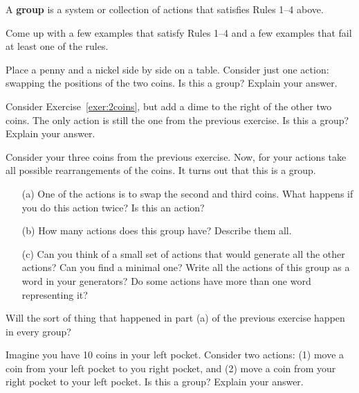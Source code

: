 \begin{intuitivedef}\label{def:informal_group}
A \textbf{group} is a system or collection of actions that satisfies Rules 1--4 above.
\end{intuitivedef}

\begin{exercise}
Come up with a few examples that satisfy Rules 1--4 and a few examples that fail at least one of the rules.
\end{exercise}

\begin{exercise}\label{exer:2coins}%
Place a penny and a nickel side by side on a table.  Consider just one action: swapping the positions of the two coins.  Is this a group?  Explain your answer.
\end{exercise}

\begin{exercise}
Consider Exercise~\ref{exer:2coins}, but add a dime to the right of the other two coins.  The only action is still the one from the previous exercise.  Is this a group?   Explain your answer.
\end{exercise}

\begin{exercise}
Consider your three coins from the previous exercise.  Now, for your actions take all possible rearrangements of the coins.  It turns out that this is a group.
\begin{enumerate}
\item[(a)] One of the actions is to swap the second and third coins.  What happens if you do this action twice?  Is this an action?  
\item[(b)] How many actions does this group have?  Describe them all.
\item[(c)] Can you think of a small set of actions that would generate all the other actions?  Can you find a minimal one?  Write all the actions of this group as a word in your generators?  Do some actions have more than one word representing it?
\end{enumerate}
\end{exercise}

\begin{exercise}
Will the sort of thing that happened in part (a) of the previous exercise happen in every group?
\end{exercise}

\begin{exercise}%
Imagine you have 10 coins in your left pocket.  Consider two actions: (1) move a coin from your left pocket to you right pocket, and (2) move a coin from your right pocket to your left pocket.  Is this a group?  Explain your answer.
\end{exercise}

